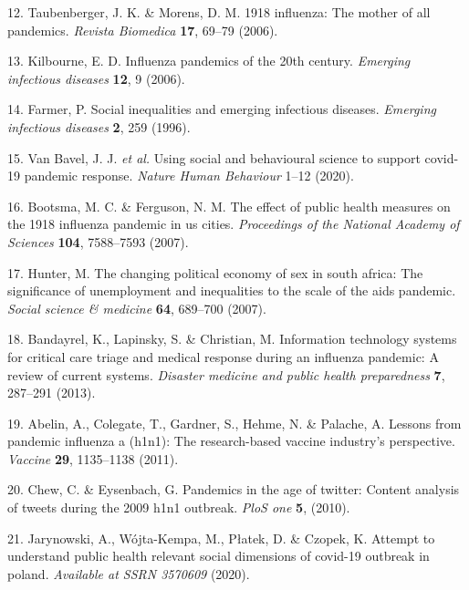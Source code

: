 \documentclass[]{article}
\begin{document}
\leavevmode\hypertarget{ref-taubenberger20061918}{}%
12. Taubenberger, J. K. \& Morens, D. M. 1918 influenza: The mother of all pandemics. \emph{Revista Biomedica} \textbf{17}, 69--79 (2006).

\leavevmode\hypertarget{ref-kilbourne2006influenza}{}%
13. Kilbourne, E. D. Influenza pandemics of the 20th century. \emph{Emerging infectious diseases} \textbf{12}, 9 (2006).

\leavevmode\hypertarget{ref-farmer1996social}{}%
14. Farmer, P. Social inequalities and emerging infectious diseases. \emph{Emerging infectious diseases} \textbf{2}, 259 (1996).

\leavevmode\hypertarget{ref-van2020using}{}%
15. Van Bavel, J. J. \emph{et al.} Using social and behavioural science to support covid-19 pandemic response. \emph{Nature Human Behaviour} 1--12 (2020).

\leavevmode\hypertarget{ref-bootsma2007effect}{}%
16. Bootsma, M. C. \& Ferguson, N. M. The effect of public health measures on the 1918 influenza pandemic in us cities. \emph{Proceedings of the National Academy of Sciences} \textbf{104}, 7588--7593 (2007).

\leavevmode\hypertarget{ref-hunter2007changing}{}%
17. Hunter, M. The changing political economy of sex in south africa: The significance of unemployment and inequalities to the scale of the aids pandemic. \emph{Social science \& medicine} \textbf{64}, 689--700 (2007).

\leavevmode\hypertarget{ref-bandayrel2013information}{}%
18. Bandayrel, K., Lapinsky, S. \& Christian, M. Information technology systems for critical care triage and medical response during an influenza pandemic: A review of current systems. \emph{Disaster medicine and public health preparedness} \textbf{7}, 287--291 (2013).

\leavevmode\hypertarget{ref-abelin2011lessons}{}%
19. Abelin, A., Colegate, T., Gardner, S., Hehme, N. \& Palache, A. Lessons from pandemic influenza a (h1n1): The research-based vaccine industry's perspective. \emph{Vaccine} \textbf{29}, 1135--1138 (2011).

\leavevmode\hypertarget{ref-chew2010pandemics}{}%
20. Chew, C. \& Eysenbach, G. Pandemics in the age of twitter: Content analysis of tweets during the 2009 h1n1 outbreak. \emph{PloS one} \textbf{5}, (2010).

\leavevmode\hypertarget{ref-jarynowski2020attempt}{}%
21. Jarynowski, A., Wójta-Kempa, M., Płatek, D. \& Czopek, K. Attempt to understand public health relevant social dimensions of covid-19 outbreak in poland. \emph{Available at SSRN 3570609} (2020).
\end{document}
